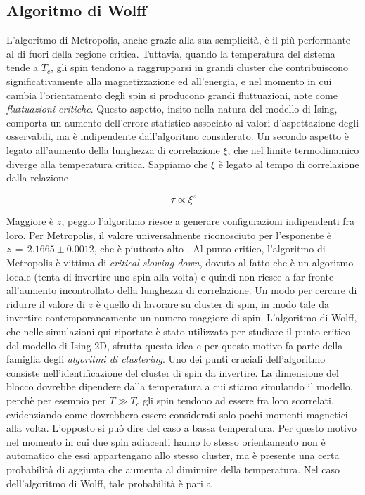 \subsection{Algoritmo di Wolff}

L'algoritmo di Metropolis, anche grazie alla sua semplicità, è il più performante al di fuori della regione 
critica. Tuttavia, quando la temperatura del sistema tende a $T_c$, gli spin tendono a raggrupparsi in 
grandi cluster che contribuiscono significativamente alla magnetizzazione ed all'energia, e nel momento in 
cui cambia l'orientamento degli spin si producono grandi fluttuazioni, note come \textit{fluttuazioni critiche}. 
Questo aspetto, insito nella natura del modello di Ising, comporta un aumento dell'errore statistico 
associato ai valori d'aspettazione degli osservabili, ma è indipendente dall'algoritmo considerato. Un secondo aspetto è legato 
all'aumento della lunghezza di correlazione $\xi$, che nel limite termodinamico diverge alla temperatura critica. Sappiamo che $\xi$ 
è legato al tempo di correlazione dalla relazione 

\begin{equation}
    \tau \propto \xi^z
    \label{eq: tcorr_lcorr}
\end{equation}

Maggiore è $z$, peggio l'algoritmo riesce a generare configurazioni indipendenti fra loro. Per Metropolis, il valore universalmente 
riconosciuto per l'esponente è $z\,=\,2.1665 \pm 0.0012$, che è piuttosto alto \cite{MCM}. Al punto critico, l'algoritmo di Metropolis è vittima 
di \textit{critical slowing down}, dovuto al fatto che è un algoritmo locale (tenta di invertire uno spin alla volta) e quindi non 
riesce a far fronte all'aumento incontrollato della lunghezza di correlazione. Un modo per cercare di ridurre il valore di $z$ è quello 
di lavorare su cluster di spin, in modo tale da invertire contemporaneamente un numero maggiore di spin. L'algoritmo di Wolff, che nelle 
simulazioni qui riportate è stato utilizzato per studiare il punto critico del modello di Ising 2D, sfrutta questa idea e per questo 
motivo fa parte della famiglia degli \textit{algoritmi di clustering}. Uno dei punti cruciali dell'algoritmo consiste nell'identificazione 
del cluster di spin da invertire. La dimensione del blocco dovrebbe dipendere dalla temperatura a cui stiamo simulando il modello, perchè 
per esempio per $T \gg T_c$ gli spin tendono ad essere fra loro scorrelati, evidenziando come dovrebbero essere considerati solo pochi 
momenti magnetici alla volta. L'opposto si può dire del caso a bassa temperatura. Per questo motivo nel momento in cui due spin adiacenti 
hanno lo stesso orientamento non è automatico che essi appartengano allo stesso cluster, ma è presente una certa probabilità di aggiunta 
che aumenta al diminuire della temperatura. Nel caso dell'algoritmo di Wolff, tale probabilità è pari a 


